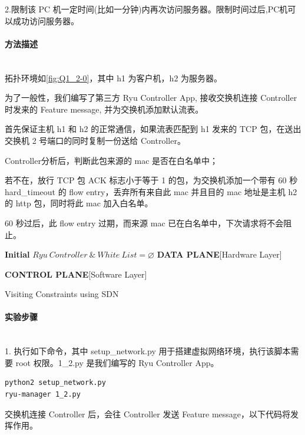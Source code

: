 \documentclass[format=draft,language=chinese,category=SDN]{hustreport}
\newcommand{\myparagraph}[1]{\paragraph{#1}\mbox{}\\}
\begin{document}
2.限制该 PC 机一定时间(比如一分钟)内再次访问服务器。限制时间过后,PC机可以成功访问服务器。

\myparagraph{方法描述}

拓扑环境如\autoref{fig:Q1_2-0}，其中 h1 为客户机，h2 为服务器。

为了一般性，我们编写了第三方 Ryu Controller App, 接收交换机连接 Controller 时发来的 Feature message, 并为交换机添加默认流表。

首先保证主机 h1 和 h2 的正常通信，如果流表匹配到 h1 发来的 TCP 包，在送出交换机 2 号端口的同时复制一份送给 Controller。

Controller分析后，判断此包来源的 mac 是否在白名单中；

若不在，放行 TCP 包 ACK 标志小于等于 1 的包，为交换机添加一个带有 60 秒 hard\_timeout 的 flow entry，丢弃所有来自此 mac 并且目的 mac 地址是主机 h2 的 http 包，同时将此 mac 加入白名单。

60 秒过后，此 flow entry 过期，而来源 mac 已在白名单中，下次请求将不会阻止。

\begin{algorithm}[H]
	\SetAlgoLined
	\textbf{Initial}  $Ryu~Controller~\&~White~List = \varnothing$ \;\label{alg_line:Q1_2DataPlane}
	\textbf{DATA PLANE}[Hardware Layer]\;

	\textbf{CONTROL PLANE}[Software Layer]\;
	\caption{Visiting Constraints using SDN}\label{alg:Q1_2}
\end{algorithm}

\myparagraph{实验步骤}

1. 执行如下命令，其中 setup\_network.py 用于搭建虚拟网络环境，执行该脚本需要 root 权限。1\_2.py 是我们编写的 Ryu Controller App。

\begin{lstlisting}[language=bash]
python2 setup_network.py
ryu-manager 1_2.py
\end{lstlisting}

交换机连接 Controller 后，会往 Controller 发送 Feature message，以下代码将发挥作用。
\end{document}
